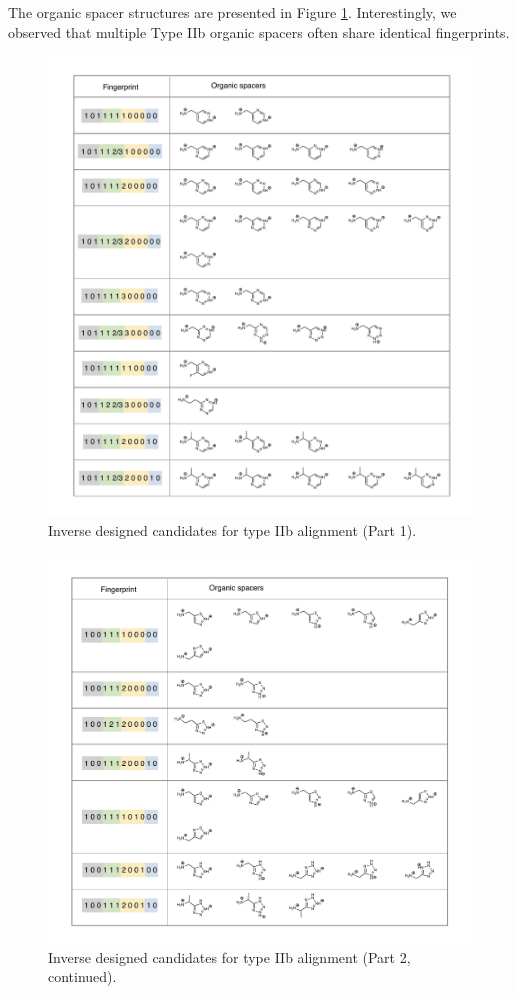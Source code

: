 The organic spacer structures are presented in Figure \ref{fig:figure5.19}. Interestingly, we observed that multiple Type IIb organic spacers often share identical fingerprints.

\begin{figure}[htbp]
    \centering
    \includegraphics[width=\textwidth]{figures/synthesis-feasibility/figure5-19-1.pdf}
    \caption{Inverse designed candidates for type IIb alignment (Part 1).}
    \label{fig:figure5.19}
\end{figure}

\begin{figure}[htbp]
    \ContinuedFloat
    \centering
    \includegraphics[width=\textwidth]{figures/synthesis-feasibility/figure5-19-2.pdf}
    \caption{Inverse designed candidates for type IIb alignment (Part 2, continued).}
\end{figure}

